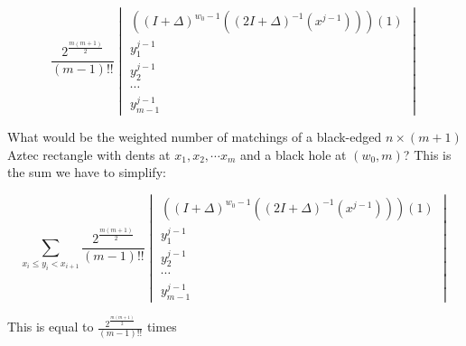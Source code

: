 \documentclass[10pt,reqno]{amsart}
\theoremstyle{plain}
\theoremstyle{definition}
\theoremstyle{remark}
\begin{document}
\begin{equation}
\frac{2^{\frac{m(m+1)}{2}}}{(m-1)!!}
\begin{vmatrix}
((I+\Delta)^{w_0-1} ((2I+\Delta)^{-1} (x^{j-1})))(1) \\
y_1^{j-1} \\
y_2^{j-1} \\
\dotsb \\
y_{m-1}^{j-1}
\end{vmatrix}
\label{eq:8}
\end{equation}

What would be the weighted number of matchings of a black-edged 
$n\times (m+1)$ Aztec rectangle with dents at $x_1,x_2,\dotsb x_m$
and a black hole at $(w_0,m)$? This is the sum we have to simplify:

\begin{equation}
\sum_{x_i\leq y_i<x_{i+1}} \frac{2^{\frac{m(m+1)}{2}}}{(m-1)!!}
\begin{vmatrix}
((I+\Delta)^{w_0-1} ((2I+\Delta)^{-1} (x^{j-1})))(1) \\
y_1^{j-1} \\
y_2^{j-1} \\
\dotsb \\
y_{m-1}^{j-1}
\end{vmatrix}
\end{equation}

This is equal to $\frac{2^{\frac{m(m+1)}{2}}}{(m-1)!!}$ times
\end{document}
